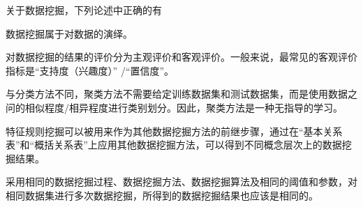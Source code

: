 \begin{problem}
关于数据挖掘，下列论述中正确的有
\myline
\begin{compactenum}[A.]
    \item 数据挖掘属于对数据的演绎。
    \item 对数据挖掘的结果的评价分为主观评价和客观评价。一般来说，最常见的客观评价指标是“支持度（兴趣度）” /“置信度”。
    \item 与分类方法不同，聚类方法不需要给定训练数据集和测试数据集，而是使用数据之问的相似程度/相异程度进行类别划分。因此，聚类方法是一种无指导的学习。
    \item 特征规则挖掘可以被用来作为其他数据挖掘方法的前继步骤，通过在“基本关系表”和“概括关系表”上应用其他数据挖掘方法，可以得到不同概念层次上的数据挖掘结果。
    \item 采用相同的数据挖掘过程、数据挖掘方法、数据挖掘算法及相同的阈值和参数，对相同数据集进行多次数据挖掘，所得到的数据挖掘结果也应该是相同的。
\end{compactenum}
\end{problem}


